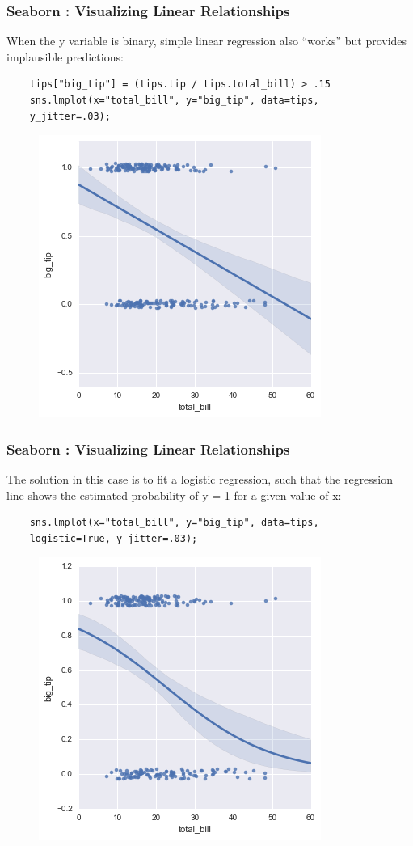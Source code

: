 \documentclass{beamer}
\begin{document}
\begin{frame}[fragile]
	\frametitle{Seaborn : Visualizing Linear Relationships}
	When the y variable is binary, simple linear regression also “works” but provides implausible predictions:
	\begin{verbatim}
	tips["big_tip"] = (tips.tip / tips.total_bill) > .15
	sns.lmplot(x="total_bill", y="big_tip", data=tips,
	y_jitter=.03);
	\end{verbatim}
	\begin{figure}
		\centering
		\includegraphics[width=0.55\linewidth]{images/regression_29_0}
	\end{figure}
	
\end{frame}
\begin{frame}[fragile]
	\frametitle{Seaborn : Visualizing Linear Relationships}
	The solution in this case is to fit a logistic regression, such that the regression line shows the estimated probability of y = 1 for a given value of x:
	\begin{verbatim}
	sns.lmplot(x="total_bill", y="big_tip", data=tips,
	logistic=True, y_jitter=.03);
	\end{verbatim}
	\begin{figure}
		\centering
		\includegraphics[width=0.55\linewidth]{images/regression_31_0}
	\end{figure}
\end{frame}
\end{document}
